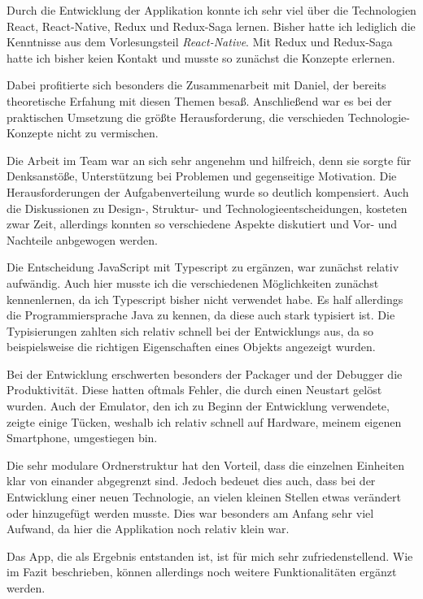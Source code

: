 Durch die Entwicklung der Applikation konnte ich sehr viel über die Technologien React, React-Native, Redux und Redux-Saga lernen.
Bisher hatte ich lediglich die Kenntnisse aus dem Vorlesungsteil \textit{React-Native}. Mit Redux und Redux-Saga hatte ich 
bisher keien Kontakt und musste so zunächst die Konzepte erlernen. 

Dabei profitierte sich besonders die Zusammenarbeit mit Daniel, der bereits theoretische Erfahung mit diesen Themen besaß.
Anschließend war es bei der praktischen Umsetzung die größte Herausforderung, die verschieden Technologie-Konzepte 
nicht zu vermischen. 

Die Arbeit im Team war an sich sehr angenehm und hilfreich, denn sie  sorgte für Denksanstöße, Unterstützung bei Problemen und gegenseitige Motivation. 
Die Herausforderungen der Aufgabenverteilung wurde so deutlich kompensiert. 
Auch die Diskussionen zu Design-, Struktur- und Technologieentscheidungen, kosteten zwar Zeit, allerdings konnten so verschiedene Aspekte diskutiert und 
Vor- und Nachteile anbgewogen werden. 

Die Entscheidung JavaScript mit Typescript zu ergänzen, war zunächst relativ aufwändig. Auch hier musste ich die verschiedenen Möglichkeiten zunächst kennenlernen,
 da ich Typescript bisher nicht verwendet habe. Es half allerdings die Programmiersprache Java zu kennen, da diese auch stark typisiert ist.  
Die Typisierungen zahlten sich relativ schnell bei der Entwicklungs aus, da so beispielsweise die richtigen Eigenschaften eines Objekts angezeigt wurden. 

Bei der Entwicklung erschwerten besonders der Packager und der Debugger die Produktivität. 
Diese hatten oftmals Fehler, die durch einen Neustart gelöst wurden. Auch der Emulator, den ich zu Beginn der Entwicklung 
verwendete, zeigte einige Tücken, weshalb ich relativ schnell auf Hardware, meinem eigenen Smartphone, umgestiegen bin. 

Die sehr modulare Ordnerstruktur hat den Vorteil, dass die einzelnen Einheiten klar von einander abgegrenzt sind. 
Jedoch bedeuet dies auch, dass bei der Entwicklung einer neuen Technologie, an vielen kleinen Stellen etwas verändert oder
hinzugefügt werden musste. Dies war besonders am Anfang sehr viel Aufwand, da hier die Applikation noch relativ klein war. 

Das App, die als Ergebnis entstanden ist, ist für mich sehr zufriedenstellend. Wie im Fazit beschrieben, können allerdings 
noch weitere Funktionalitäten ergänzt werden. 

